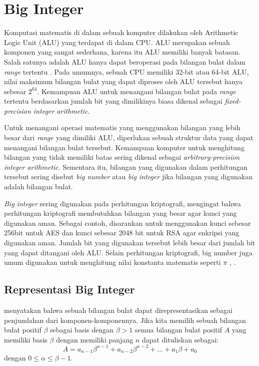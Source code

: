 \section{Big Integer}
  Komputasi matematis di dalam sebuah komputer dilakukan oleh Arithmetic Logic Unit (ALU) yang terdapat di dalam CPU. ALU merupakan sebuah komponen yang sangat sederhana, karena itu ALU memiliki banyak batasan. Salah satunya adalah ALU hanya dapat beroperasi pada bilangan bulat dalam \textit{range} tertentu \citep{comp_org_arch}. Pada umumnya, sebuah CPU memiliki 32-bit atau 64-bit ALU, nilai maksimum bilangan bulat yang dapat diproses oleh ALU tersebut hanya sebesar $2^{64}$. Kemampuan ALU untuk menangani bilangan bulat pada \textit{range} tertentu berdasarkan jumlah bit yang dimilikinya biasa dikenal sebagai \textit{fixed-precision integer arithmetic}.

  Untuk menangani operasi matematis yang menggunakan bilangan yang lebih besar dari \textit{range} yang dimiliki ALU, diperlukan sebuah struktur data yang dapat menangani bilangan bulat tersebut. Kemampuan komputer untuk menghitung bilangan yang tidak memiliki batas sering dikenal sebagai \textit{arbitrary-precision integer arithmetic}. Sementara itu, bilangan yang digunakan dalam perhitungan tersebut sering disebut \textit{big number} atau \textit{big integer} jika bilangan yang digunakan adalah bilangan bulat.

  \textit{Big integer} sering digunakan pada perhitungan kriptografi, mengingat bahwa perhitungan kriptografi membutuhkan bilangan yang besar agar kunci yang digunakan aman. Sebagai contoh, disarankan untuk menggunakan kunci sebesar 256bit untuk AES dan kunci sebesar 2048 bit untuk RSA \citep{key_suggestion} agar enkripsi yang digunakan aman. Jumlah bit yang digunakan tersebut lebih besar dari jumlah bit yang dapat ditangani oleh ALU. Selain perhitungan kriptografi, big number juga umum digunakan untuk menghitung nilai konstanta matematis seperti $\pi$ \citep{bn_pi}, .


  \subsection{Representasi Big Integer}

      \citet{modern_comp_math} menyatakan bahwa sebuah bilangan bulat dapat direpresentasikan sebagai penjumlahan dari komponen-komponennya. Jika kita memilih sebuah bilangan bulat positif $\beta$ sebagai basis dengan $\beta > 1 $ semua bilangan bulat positif $A$ yang memiliki basis $\beta$ dengan memiliki panjang $n$ dapat dituliskan sebagai:
      \begin{equation} \label{eq:frns_rep}
        A = a_{n-1}\beta^{n-1}+a_{n-2}\beta^{n-2}+...+a_{1}\beta+a_{0}
      \end{equation}
      dengan $0 \leq \alpha \leq \beta -1$.

